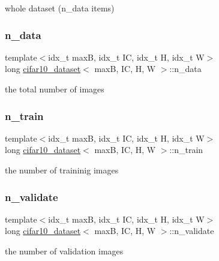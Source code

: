 whole dataset (n\+\_\+data items) \mbox{\label{structcifar10__dataset_a60c9f64838a155a1127912cf190b3ed0}} 
\subsubsection{\texorpdfstring{n\+\_\+data}{n\_data}}
{\footnotesize\ttfamily template$<$idx\+\_\+t maxB, idx\+\_\+t IC, idx\+\_\+t H, idx\+\_\+t W$>$ \\
long \hyperlink{structcifar10__dataset}{cifar10\+\_\+dataset}$<$ maxB, IC, H, W $>$\+::n\+\_\+data}

the total number of images \mbox{\label{structcifar10__dataset_ac6e5dbe7c30b683d01e600901c51e010}} 
\subsubsection{\texorpdfstring{n\+\_\+train}{n\_train}}
{\footnotesize\ttfamily template$<$idx\+\_\+t maxB, idx\+\_\+t IC, idx\+\_\+t H, idx\+\_\+t W$>$ \\
long \hyperlink{structcifar10__dataset}{cifar10\+\_\+dataset}$<$ maxB, IC, H, W $>$\+::n\+\_\+train}

the number of traininig images \mbox{\label{structcifar10__dataset_a0f447993bfd499e4222e66dca3e111a0}} 
\subsubsection{\texorpdfstring{n\+\_\+validate}{n\_validate}}
{\footnotesize\ttfamily template$<$idx\+\_\+t maxB, idx\+\_\+t IC, idx\+\_\+t H, idx\+\_\+t W$>$ \\
long \hyperlink{structcifar10__dataset}{cifar10\+\_\+dataset}$<$ maxB, IC, H, W $>$\+::n\+\_\+validate}

the number of validation images \mbox{\label{structcifar10__dataset_a59998ba824d0a527fe0f6e7aad0693eb}} 
